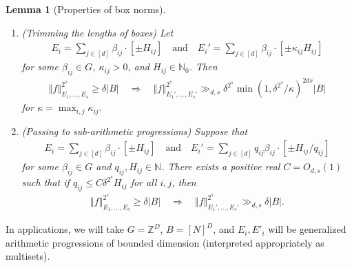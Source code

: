 \documentclass[11pt]{amsart}
\newtheorem{lemma}{Lemma}[section]
\theoremstyle{definition}
\newcommand{\N}{{\mathbb N}}
\newcommand{\Z}{{\mathbb Z}}
\newcommand{\norm}[1]{\left\Vert #1\right\Vert}
\begin{document}
\begin{lemma}[Properties of box norms]
\begin{enumerate}
\begin{align*}
        E_i = \sum_{j\in [d_i]}\beta_{ij}\cdot[\pm H_{ij}]\quad \textrm{and}\quad E_i' = \sum_{j\in [d'_i]}\beta_{ij}\cdot[\pm H_{ij}]
    \end{align*}
    for some $\beta_{ij}\in G$ and $H_{ij}\in\N_0$. Then
    \begin{align*}
        \norm{f}_{E_1, \ldots, E_s}^{2^s}\geq \delta |B|\quad\Longrightarrow \quad \norm{f}_{E_1', \ldots, E_s'}^{2^s}\geq \delta^{2^s}|B|.
    \end{align*}
    \item\label{i: trimming 2} (Trimming the lengths of boxes) Let
    \begin{align*}%
        E_i = \sum_{j\in [d]}\beta_{ij}\cdot[\pm H_{ij}]\quad \textrm{and}\quad E_i' = \sum_{j\in [d]}\beta_{ij}\cdot[\pm \kappa_{ij} H_{ij}]
    \end{align*}
    for some $\beta_{ij}\in G$, $\kappa_{ij}>0$, and $H_{ij}\in \N_0$. Then
    \begin{align*}
        \norm{f}_{E_1, \ldots, E_s}^{2^s}\geq \delta |B|\quad \Longrightarrow\quad        \norm{f}_{E_1', \ldots, E_s'}^{2^s}\gg_{d,s}\delta^{2^s}\min(1, \delta^{2^s}/\kappa)^{2ds}|B|
    \end{align*}
    for $\kappa = \max_{i,j}\kappa_{ij}.$
    \item\label{i: passing to APs} (Passing to sub-arithmetic progressions)
    Suppose that 
    \begin{align*}%
        E_i = \sum_{j\in [d]}\beta_{ij}\cdot[\pm H_{ij}]\quad \textrm{and}\quad E_i' = \sum_{j\in [d]}q_{ij}\beta_{ij}\cdot[\pm H_{ij}/q_{ij}]
    \end{align*}
    for some $\beta_{ij}\in G$ and $q_{ij}, H_{ij}\in\N$. There exists a positive real $C=O_{d,s}(1)$ such that if $q_{ij} \leq C \delta^{2^s}H_{ij}$ for all $i, j$, then
    \begin{align*}
        \norm{f}_{E_1, \ldots, E_s}^{2^s}\geq \delta |B|\quad \Longrightarrow\quad        \norm{f}_{E_1', \ldots, E_s'}^{2^s}\gg_{d,s} \delta|B|.
    \end{align*}
\end{enumerate}
\end{lemma}
In applications, we will take $G = \Z^D$, $B = [N]^D$, and $E_i, E'_i$ will be generalized arithmetic progressions of bounded dimension (interpreted appropriately as multisets). 
\end{document}
